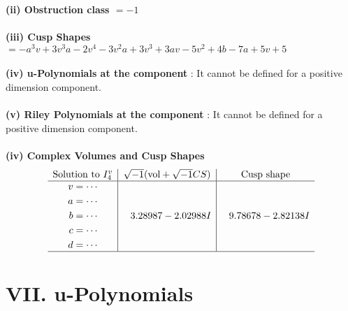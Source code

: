\documentclass[1p]{elsarticle_modified}
\theoremstyle{definition}
\newcommand{\I}{\sqrt{-1}}
\begin{document}
\flushleft \textbf{(ii) Obstruction class $= -1$}\\~\\
\flushleft \textbf{(iii) Cusp Shapes $= - a^3 v+3 v^3 a-2 v^4-3 v^2 a+3 v^3+3 a v-5 v^2+4 b-7 a+5 v+5$}\\~\\
\flushleft \textbf{(iv) u-Polynomials at the component} : It cannot be defined for a positive dimension component.\\~\\
\flushleft \textbf{(v) Riley Polynomials at the component} : It cannot be defined for a positive dimension component.\\~\\
\newpage\flushleft \textbf{(iv) Complex Volumes and Cusp Shapes}
$$\begin{array}{c|c|c} 
\text{Solution to }I^v_{4}& \I (\text{vol} + \sqrt{-1}CS) & \text{Cusp shape}\\
 \hline 
\begin{aligned}
v &= \cdots \\
a &= \cdots \\
b &= \cdots \\
c &= \cdots \\
d &= \cdots\end{aligned}
 & \phantom{-}3.28987 - 2.02988 I & \phantom{-}9.78678 - 2.82138 I\\
 \hline 
 \end{array}
$$
\newpage\renewcommand{\arraystretch}{1}
\centering \section*{ VII. u-Polynomials}
\end{document}

